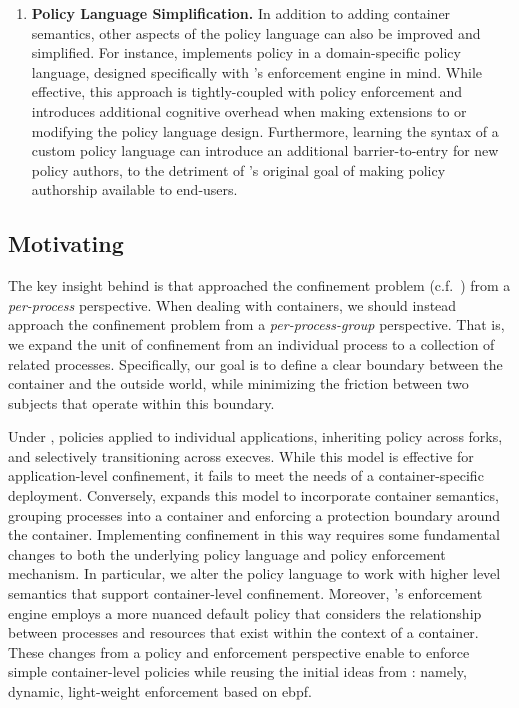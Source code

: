 \begin{enumerate}
  \item \textbf{Policy Language Simplification.}
    In addition to adding container semantics, other aspects of the \bpfbox{} policy
    language can also be improved and simplified. For instance, \bpfbox{} implements
    policy in a domain-specific policy language, designed specifically with \bpfbox{}'s
    enforcement engine in mind. While effective, this approach is tightly-coupled with
    policy enforcement and introduces additional cognitive overhead when making extensions
    to or modifying the policy language design. Furthermore, learning the syntax of
    a custom policy language can introduce an additional barrier-to-entry for new policy
    authors, to the detriment of \bpfbox{}'s original goal of making policy authorship
    available to end-users.
\end{enumerate}

\subsection{Motivating \bpfcontain{}}

The key insight behind \bpfcontain{} is that \bpfbox{} approached the confinement problem
(c.f.\ ) from a \textit{per-process} perspective. When dealing
with containers, we should instead approach the confinement problem from
a \textit{per-process-group} perspective. That is, we expand the unit of confinement from
an individual process to a collection of related processes. Specifically, our goal is to
define a clear boundary between the container and the outside world, while minimizing the
friction between two subjects that operate within this boundary.

Under \bpfbox{}, policies applied to individual applications, inheriting policy across
forks, and selectively transitioning across execves. While this model is effective for
application-level confinement, it fails to meet the needs of a container-specific
deployment.  Conversely, \bpfcontain{} expands this model to incorporate container
semantics, grouping processes into a container and enforcing a protection boundary around
the container.  Implementing confinement in this way requires some fundamental changes to
both the underlying policy language and policy enforcement mechanism. In particular, we
alter the policy language to work with higher level semantics that support container-level
confinement. Moreover, \bpfcontain{}'s enforcement engine employs a more nuanced default
policy that considers the relationship between processes and resources that exist within
the context of a container. These changes from a policy and enforcement perspective enable
\bpfcontain{} to enforce simple container-level policies while reusing the initial ideas
from \bpfbox{}: namely, dynamic, light-weight enforcement based on \gls{ebpf}.

